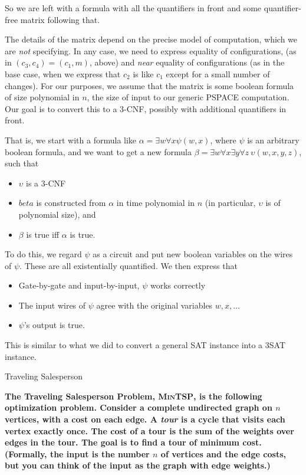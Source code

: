 \documentclass[2pt]{scrartcl}
\makeatletter
\renewcommand{\subsubsection}{\@startsection{subsubsection}{3}{0mm}
  {-1ex plus -.5ex minus -.2ex}
  {1ex plus .2ex}
{\normalfont\small\bfseries}}
\makeatother
\begin{document}
\begin{multicols}{6}
So we are left with a formula with all the quantifiers in front and
some quantifier-free matrix following that.

The details of the matrix depend on the precise model of computation,
which we are {\em not} specifying.  In any case, we need to express
equality of configurations, (as in $(c_3,c_4)=(c_1,m)$, above) and
{\em near} equality of configurations (as in the base case, when we
express that $c_2$ is like $c_1$ except for a small number of
changes).  For our purposes, we assume that the matrix is some boolean
formula of size polynomial in $n$, the size of input to our generic
PSPACE computation.  Our goal is to convert this to a 3-CNF, possibly
with additional quantifiers in front.

That is, we start with a formula like $\alpha=\exists w\forall x \psi(w,x)$,
where $\psi$ is an arbitrary boolean formula, and we want to get a new
formula $\beta=\exists w\forall x\exists y\forall
z\>\upsilon(w,x,y,z)$, such that
\begin{itemize}
\item $\upsilon$ is a 3-CNF
\item $beta$ is constructed from $\alpha$ in time polynomial in $n$
  (in particular, $\upsilon$ is of polynomial size), and
\item $\beta$ is true iff $\alpha$ is true.
\end{itemize}

To do this, we regard $\psi$ as a circuit and put new boolean
variables on the wires of $\psi$.  These are all existentially
quantified.  We then express that
\begin{itemize}
\item Gate-by-gate and input-by-input, $\psi$ works correctly
\item The input wires of $\psi$ agree with the original variables
  $w,x,\ldots$
\item $\psi$'s output is true.
\end{itemize}
This is similar to what we did to convert a general SAT instance into
a 3SAT instance.
        
        \subsubsection{Traveling Salesperson}

            {\bf The Traveling Salesperson Problem, \textsc{MinTSP}, is the following
optimization problem.  Consider a complete undirected graph on $n$
vertices, with a cost on each edge.  A {\em tour} is a cycle that
visits each vertex exactly once.  The cost of a tour is the sum of the
weights over edges in the tour.  The goal is to find a tour of minimum
cost.  (Formally, the input is the number $n$ of vertices and the edge
costs, but you can think of the input as the graph with edge weights.)

}
\end{multicols}
\end{document}
